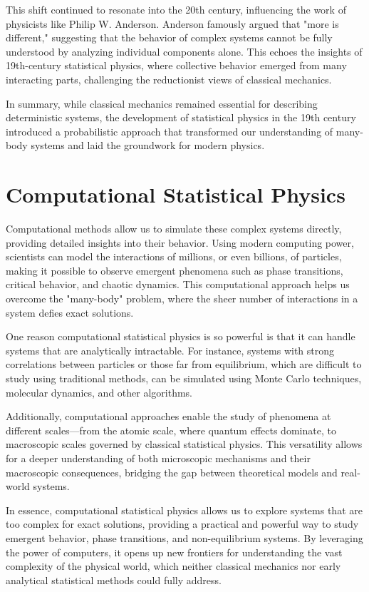 \documentclass[ansiapaper]{report}
\begin{document}
\begin{multicols}{3}
  This shift continued to resonate into the 20th century, influencing the work of physicists like Philip W. Anderson. Anderson famously argued that "more is different," suggesting that the behavior of complex systems cannot be fully understood by analyzing individual components alone. This echoes the insights of 19th-century statistical physics, where collective behavior emerged from many interacting parts, challenging the reductionist views of classical mechanics.

  In summary, while classical mechanics remained essential for describing deterministic systems, the development of statistical physics in the 19th century introduced a probabilistic approach that transformed our understanding of many-body systems and laid the groundwork for modern physics.

  \section{Computational Statistical Physics}

  Computational methods allow us to simulate these complex systems directly, providing detailed insights into their behavior. Using modern computing power, scientists can model the interactions of millions, or even billions, of particles, making it possible to observe emergent phenomena such as phase transitions, critical behavior, and chaotic dynamics. This computational approach helps us overcome the "many-body" problem, where the sheer number of interactions in a system defies exact solutions.

  One reason computational statistical physics is so powerful is that it can handle systems that are analytically intractable. For instance, systems with strong correlations between particles or those far from equilibrium, which are difficult to study using traditional methods, can be simulated using Monte Carlo techniques, molecular dynamics, and other algorithms.

  Additionally, computational approaches enable the study of phenomena at different scales—from the atomic scale, where quantum effects dominate, to macroscopic scales governed by classical statistical physics. This versatility allows for a deeper understanding of both microscopic mechanisms and their macroscopic consequences, bridging the gap between theoretical models and real-world systems.

  In essence, computational statistical physics allows us to explore systems that are too complex for exact solutions, providing a practical and powerful way to study emergent behavior, phase transitions, and non-equilibrium systems. By leveraging the power of computers, it opens up new frontiers for understanding the vast complexity of the physical world, which neither classical mechanics nor early analytical statistical methods could fully address.


\end{multicols}
\end{document}
